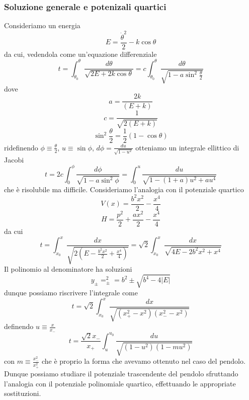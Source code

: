 \documentclass[
10pt, %
a4paper, %
oneside, %
headinclude,footinclude, %
BCOR5mm, %
]{scrartcl}
\begin{document}
\subsubsection{Soluzione generale e potenizali quartici}
Consideriamo un energia 
\[E = \frac{\dot{\theta}^2}{2}-k\cos\theta\]
da cui, vedendola come un'equazione differenziale
\[t = \int_{\theta_0}^\theta \frac{d\theta}{\sqrt{2E+2k\cos\theta}} = c\int_{\theta_0}^\theta \frac{d\theta}{\sqrt{1-a\sin^2\frac{\theta}{2}}}\]
dove 
\[a = \frac{2k}{(E+k)}\]
\[c = \frac{1}{\sqrt{2(E+k)}}\]
\[\sin^2\frac{\theta}{2} = \frac{1}{2}(1-\cos\theta)\]
ridefinendo \(\phi \equiv \frac{\theta}{2}\), \(u \equiv \sin\phi\), \(d\phi = \frac{du}{\sqrt{1-u^2}}\) otteniamo un integrale ellittico di Jacobi
\[t = 2c\int_0^{\phi} \frac{d\phi}{\sqrt{1-a\sin^2\phi}} = \int_{0}^{u}\frac{du}{\sqrt{1-(1+a)u^2+au^4}}\]
che è risolubile ma difficile. Consideriamo l'analogia con il potenziale quartico
\[V(x) = \frac{b^2x^2}{2}-\frac{x^4}{4}\]
\[H = \frac{p^2}{2}+\frac{ax^2}{2}-\frac{x^4}{4}\]
da cui
\[t = \int^x_{x_0}\frac{dx}{\sqrt{2\left(E-\frac{b^2x^2}{2}+\frac{x^4}{4}\right)}} = 
	  \sqrt{2}\int^x_{x_0}\frac{dx}{\sqrt{4E-2{b^2x^2}+{x^4}}}
\]
Il polinomio al denominatore ha soluzioni
\[y_\pm = _\pm^2 = b^2\pm\sqrt{b^4-4|E|}\]
dunque possiamo riscrivere l'integrale come
\[t = \sqrt{2}\int^x_{x_0}\frac{dx}{\sqrt{(x_+^2-x^2)(x_-^2-x^2)}}\]
definendo \(u \equiv \frac{x}{x_-}\)
\[t = \frac{\sqrt{2}x_-}{x_+}\int_{u}^{u_0}\frac{du}{\sqrt{(1-u^2)(1-m u^2)}}\]
con \(m \equiv \frac{x_-^2}{x_+^2}\)
che è proprio la forma che avevamo ottenuto nel caso del pendolo. Dunque possiamo studiare il potenziale trascendente del pendolo sfruttando l'analogia con il potenziale polinomiale quartico, effettuando le appropriate sostituzioni.
\end{document}
